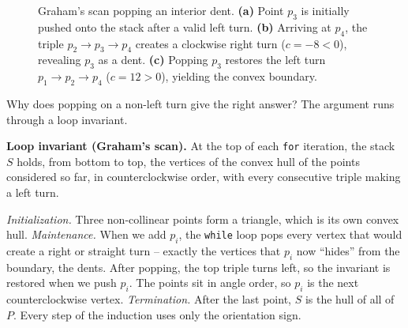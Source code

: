 \begin{figure}[H]
\caption{Graham's scan popping an interior dent. \textbf{(a)} Point $p_3$ is
initially pushed onto the stack after a valid left turn. \textbf{(b)} Arriving
at $p_4$, the triple $p_2 \to p_3 \to p_4$ creates a clockwise right turn
($c=-8<0$), revealing $p_3$ as a dent. \textbf{(c)} Popping $p_3$ restores the
left turn $p_1 \to p_2 \to p_4$ ($c=12>0$), yielding the convex boundary.}
\label{ch32:fig-graham-trace}
\end{figure}

Why does popping on a non-left turn give the right answer? The argument runs
through a loop invariant.

\begin{focusbox}
\textbf{Loop invariant (Graham's scan).} At the top of each \texttt{for}
iteration, the stack $S$ holds, from bottom to top, the vertices of the convex
hull of the points considered so far, in counterclockwise order, with every
consecutive triple making a left turn.
\end{focusbox}

\emph{Initialization.} Three non-collinear points form a triangle, which is its
own convex hull.
\emph{Maintenance.} When we add $p_i$, the \texttt{while} loop pops every vertex
that would create a right or straight turn -- exactly the vertices that $p_i$ now
``hides'' from the boundary, the dents. After popping, the top triple turns left,
so the invariant is restored when we push $p_i$. The points sit in angle order, so
$p_i$ is the next counterclockwise vertex. \emph{Termination.} After the last
point, $S$ is the hull of all of $P$. Every step of the induction uses only the
orientation sign.

